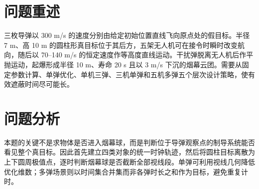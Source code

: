 \documentclass[12pt]{article}
\begin{document}

\begin{abstract}
针对无人机烟幕干扰弹的时空协同投放问题，本文建立导弹、无人机、干扰弹和烟幕云团的统一三维运动模型，并以导弹至圆柱形真目标完整可视边界的视线段均与烟幕有效球相交作为严格遮蔽判据。该判据保留了题目给定的目标半径与高度信息，并以遮蔽时间集合的测度处理多枚烟幕弹造成的不连续遮蔽。

对于问题一，由确定性轨迹计算得到完整圆柱边界的有效遮蔽区间为 8.056--9.448 s，时长 1.392 s；若仅检验目标中心视线则为 1.435 s，说明忽略目标尺寸会高估结果。

对于问题二，将待优化起爆点参数化为导弹--目标中心视线上的点，并由几何关系反求无人机航向、速度和引信时序，再用差分进化搜索。所得航向 176.91$^\circ$、速度 71.00 m/s、投放时刻 0.009 s、起爆时刻 2.461 s，严格遮蔽时长为 4.540 s。

对于问题三，以同一航向和速度约束下的边际遮蔽增益依次安排三枚弹，联合遮蔽 4.620 s；对于问题四，三架无人机采用边际协同搜索，形成三个不连续区间，合计 11.530 s。对于问题五，先比较无人机--导弹配对的可达遮蔽能力，再在各架无人机固定航迹上追加具有正边际收益的烟幕弹。最终使用 8 枚弹，对 M1、M2、M3 分别遮蔽 13.400 s、3.770 s、3.730 s，总和为 20.900 s。全部策略已写入官方 Excel 模板。
\end{abstract}

\section{问题重述}

三枚导弹以 300 m/s 的速度分别由给定初始位置直线飞向原点处的假目标。半径 7 m、高 10 m 的圆柱形真目标位于其后方，五架无人机可在接令时瞬时改变航向，随后以 70--140 m/s 的恒定速度作等高度直线运动。干扰弹脱离无人机后作平抛运动，起爆形成半径 10 m、寿命 20 s 且以 3 m/s 下沉的烟幕云团。需要从固定参数计算、单弹优化、单机三弹、三机单弹和五机多弹五个层次设计策略，使有效遮蔽时间尽可能长。

\section{问题分析}

本题的关键不是求物体是否进入烟幕球，而是判断位于导弹观察点的制导系统能否看见整个真目标。因此首先建立四类对象的统一时钟轨迹，然后将圆柱目标离散为上下圆周极值点，逐时判断烟幕球是否截断全部视线段。单弹可利用视线几何降低优化维数；多弹场景则以时间集合并集而非各弹时长之和作为目标，避免重复计时。
\end{document}

